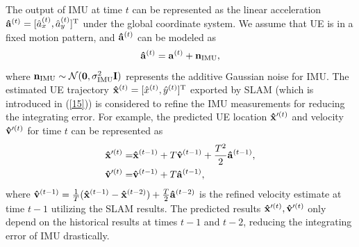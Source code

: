 \documentclass[journal,12pt,onecolumn,draftclsnofoot,]{IEEEtran}
\begin{document}
The output of IMU at time $t$ can be represented as the linear acceleration ${{\bf{\hat a}}^{(t )}} = {[ {{{\hat a}}_x^{({t} )},{{\hat a}}_y^{({t} )}} ]^{\rm T}}$ under the global coordinate system. We assume that UE is in a fixed motion pattern, and ${{\bf{\hat a}}^{(t )}}$ can be modeled as
\begin{equation}
{{\bf{\hat a}}^{\left(t \right)}} = {{\bf{a}}^{\left(t \right)}} + {{\bf{n}}_{{\rm{IMU}}}},
\end{equation}
\noindent where ${{\bf{n}}_{{\rm{IMU}}}} \sim {\mathcal{N}(\mathbf{0},\sigma _{{\rm{IMU}}}^2 \mathbf{I})}$ represents the additive Gaussian noise for IMU. The estimated UE trajectory ${{\bf{\hat x}}^{(t )}} = {[ {{{\hat x}^{({t} )}},{{\hat y}^{(t )}}} ]^{\rm T}}$ exported by SLAM (which is introduced in (\ref{15})) is considered to refine the IMU measurements for reducing the integrating error. For example, the predicted UE location ${\bf{\hat x}}{'^{(t )}}$ and velocity ${{\bf{\hat v}}'^{(t )}}$ for time $t$ can be represented as
\begin{subequations}\label{14}
\begin{align}
{\bf{\hat x}}{'^{\left(t \right)}} =&{{{\bf{\hat x}}}^{\left({t - 1} \right)}} + { T}{{{\bf{\hat v}}}^{\left({t - 1} \right)}} + \frac{{{ T}^2}}{2}{{{\bf{\hat a}}}^{\left({t - 1} \right)}},\\
{{{\bf{\hat v}}}'^{\left(t \right)}} =& {{{\bf{\hat v}}}^{\left({t - 1} \right)}} + { T}{{{\bf{\hat a}}}^{\left({t - 1} \right)}},
\end{align}
\end{subequations}
where ${\bf{\hat v}}{^{({t - 1} )}} =\frac{1}{ T}({{{{\bf{\hat x}}}^{({t - 1} )}} - {{{\bf{\hat x}}}^{({t - 2} )}}} ) + \frac{T}{2}{{{\bf{\hat a}}}^{({t - 2} )}}$ is the refined velocity estimate at time $t-1$ utilizing the SLAM results. The predicted results ${\bf{\hat x}}{'^{(t )}},{{\bf{\hat v}}'^{(t )}}$ only depend on the historical results at times $t-1$ and $t-2$, reducing the integrating error of IMU drastically.
\end{document}
